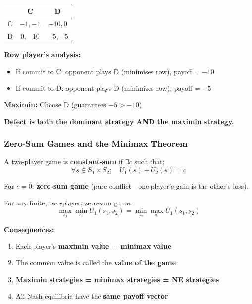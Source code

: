 \begin{exbox}
\begin{center}
\renewcommand{\arraystretch}{1.2}
\begin{tabular}{@{} c | c c @{}}
 & C & D \\
\midrule
C & $-1, -1$ & $-10, 0$ \\
D & $0, -10$ & $-5, -5$ \\
\end{tabular}
\end{center}

\textbf{Row player's analysis:}
\begin{itemize}
  \item If commit to C: opponent plays D (minimises row), payoff = $-10$
  \item If commit to D: opponent plays D (minimises row), payoff = $-5$
\end{itemize}

\textbf{Maximin:} Choose D (guarantees $-5 > -10$)

\textbf{Defect is both the dominant strategy AND the maximin strategy.}
\end{exbox}

\separator

\subsubsection{Zero-Sum Games and the Minimax Theorem}

\begin{defbox}
A two-player game is \textbf{constant-sum} if $\exists c$ such that:
\[
\forall s \in S_1 \times S_2: \quad U_1(s) + U_2(s) = c
\]

For $c = 0$: \textbf{zero-sum game} (pure conflict---one player's gain is the other's loss).
\end{defbox}

\begin{thmbox}
For any finite, two-player, zero-sum game:
\[
\max_{s_1} \min_{s_2} U_1(s_1, s_2) = \min_{s_2} \max_{s_1} U_1(s_1, s_2)
\]

\textbf{Consequences:}
\begin{enumerate}
  \item Each player's \textbf{maximin value = minimax value}
  \item The common value is called the \textbf{value of the game}
  \item \textbf{Maximin strategies = minimax strategies = NE strategies}
  \item All Nash equilibria have the \textbf{same payoff vector}
\end{enumerate}
\end{thmbox}


